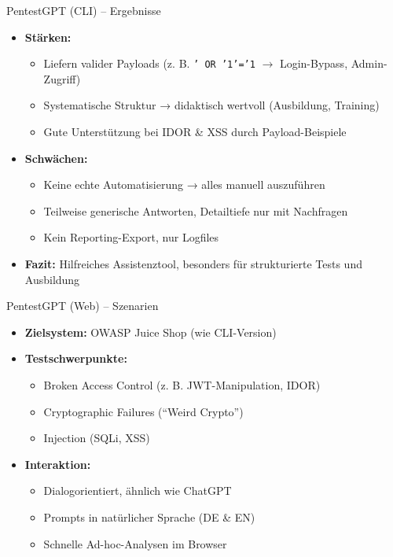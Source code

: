 \documentclass[
	aspectratio=169,	%
	onlytextwidth,		%
	t,					%
	]{beamer}
\begin{document}
\begin{frame}{PentestGPT (CLI) – Ergebnisse}
	\begin{itemize}
		\item \textbf{Stärken:}
		\begin{itemize}
			\item Liefern valider Payloads (z. B. \texttt{' OR '1'='1} $\rightarrow$ Login-Bypass, Admin-Zugriff)
			\item Systematische Struktur → didaktisch wertvoll (Ausbildung, Training)
			\item Gute Unterstützung bei IDOR \& XSS durch Payload-Beispiele
		\end{itemize}
		
		\item \textbf{Schwächen:}
		\begin{itemize}
			\item Keine echte Automatisierung → alles manuell auszuführen
			\item Teilweise generische Antworten, Detailtiefe nur mit Nachfragen
			\item Kein Reporting-Export, nur Logfiles
		\end{itemize}
		
		\item \textbf{Fazit:}  
		Hilfreiches Assistenztool, besonders für strukturierte Tests und Ausbildung
	\end{itemize}
\end{frame}













\begin{frame}{PentestGPT (Web) – Szenarien}
	\begin{itemize}
		\item \textbf{Zielsystem:} OWASP Juice Shop (wie CLI-Version)
		
		\item \textbf{Testschwerpunkte:}
		\begin{itemize}
			\item Broken Access Control (z. B. JWT-Manipulation, IDOR)
			\item Cryptographic Failures (\enquote{Weird Crypto})
			\item Injection (SQLi, XSS)
		\end{itemize}
		
		\item \textbf{Interaktion:}
		\begin{itemize}
			\item Dialogorientiert, ähnlich wie ChatGPT
			\item Prompts in natürlicher Sprache (DE \& EN)
			\item Schnelle Ad-hoc-Analysen im Browser
		\end{itemize}
	\end{itemize}

\end{frame}
\end{document}
